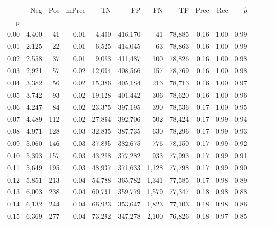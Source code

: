 \begin{tabular}{rrrrrrrrrrrrrr}
\toprule
{} &    Neg &    Pos & mPrec &       TN &       FP &      FN &      TP &  Prec &   Rec & $\hat{p}$ \\
p    &        &        &       &          &          &         &         &       &       &           \\
\midrule
0.00 &  4,400 &     41 &  0.01 &    4,400 &  416,170 &      41 &  78,885 &  0.16 &  1.00 &      0.99 \\
0.01 &  2,125 &     22 &  0.01 &    6,525 &  414,045 &      63 &  78,863 &  0.16 &  1.00 &      0.99 \\
0.02 &  2,558 &     37 &  0.01 &    9,083 &  411,487 &     100 &  78,826 &  0.16 &  1.00 &      0.98 \\
0.03 &  2,921 &     57 &  0.02 &   12,004 &  408,566 &     157 &  78,769 &  0.16 &  1.00 &      0.98 \\
0.04 &  3,382 &     56 &  0.02 &   15,386 &  405,184 &     213 &  78,713 &  0.16 &  1.00 &      0.97 \\
0.05 &  3,742 &     93 &  0.02 &   19,128 &  401,442 &     306 &  78,620 &  0.16 &  1.00 &      0.96 \\
0.06 &  4,247 &     84 &  0.02 &   23,375 &  397,195 &     390 &  78,536 &  0.17 &  1.00 &      0.95 \\
0.07 &  4,489 &    112 &  0.02 &   27,864 &  392,706 &     502 &  78,424 &  0.17 &  0.99 &      0.94 \\
0.08 &  4,971 &    128 &  0.03 &   32,835 &  387,735 &     630 &  78,296 &  0.17 &  0.99 &      0.93 \\
0.09 &  5,060 &    146 &  0.03 &   37,895 &  382,675 &     776 &  78,150 &  0.17 &  0.99 &      0.92 \\
0.10 &  5,393 &    157 &  0.03 &   43,288 &  377,282 &     933 &  77,993 &  0.17 &  0.99 &      0.91 \\
0.11 &  5,649 &    195 &  0.03 &   48,937 &  371,633 &   1,128 &  77,798 &  0.17 &  0.99 &      0.90 \\
0.12 &  5,851 &    213 &  0.04 &   54,788 &  365,782 &   1,341 &  77,585 &  0.17 &  0.98 &      0.89 \\
0.13 &  6,003 &    238 &  0.04 &   60,791 &  359,779 &   1,579 &  77,347 &  0.18 &  0.98 &      0.88 \\
0.14 &  6,132 &    244 &  0.04 &   66,923 &  353,647 &   1,823 &  77,103 &  0.18 &  0.98 &      0.86 \\
0.15 &  6,369 &    277 &  0.04 &   73,292 &  347,278 &   2,100 &  76,826 &  0.18 &  0.97 &      0.85 \\

\end{tabular}
